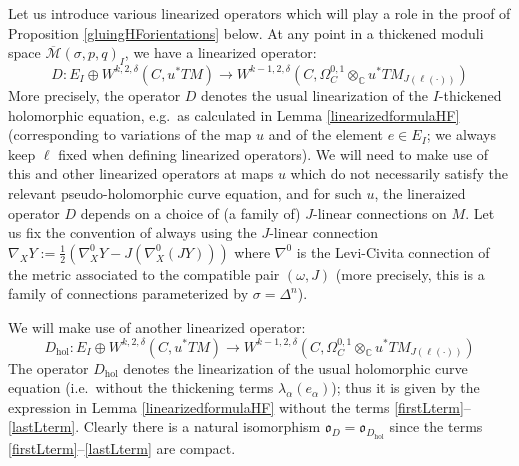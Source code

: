 \documentclass[12pt]{article}
\theoremstyle{definition}
\theoremstyle{remark}
\numberwithin{equation}{subsection}
\newcommand{\oo}{\mathfrak o}
\newcommand{\CC}{\mathbb C}
\newcommand{\Mbar}{\overline{\mathcal M}}
\begin{document}
Let us introduce various linearized operators which will play a role in the proof of Proposition \ref{gluingHForientations} below.  At any point in a thickened moduli space $\Mbar(\sigma,p,q)_I$, we have a linearized operator:
\begin{equation}
\label{linearizedstd}D:E_I\oplus W^{k,2,\delta}(C,u^\ast TM)\to W^{k-1,2,\delta}(C,\Omega^{0,1}_C\otimes_\CC u^\ast TM_{J(\ell(\cdot))})
\end{equation}
More precisely, the operator $D$ denotes the usual linearization of the $I$-thickened holomorphic equation, e.g.\ as calculated in Lemma \ref{linearizedformulaHF} (corresponding to variations of the map $u$ and of the element $e\in E_I$; we always keep $\ell$ fixed when defining linearized operators).  We will need to make use of this and other linearized operators at maps $u$ which do not necessarily satisfy the relevant pseudo-holomorphic curve equation, and for such $u$, the lineraized operator $D$ depends on a choice of (a family of) $J$-linear connections on $M$.  Let us fix the convention of always using the $J$-linear connection $\nabla_XY:=\frac 12(\nabla^0_XY-J(\nabla^0_X(JY)))$ where $\nabla^0$ is the Levi-Civita connection of the metric associated to the compatible pair $(\omega,J)$ (more precisely, this is a family of connections parameterized by $\sigma=\Delta^n$).

We will make use of another linearized operator:
\begin{equation}
\label{linearizedhol}D_\text{hol}:E_I\oplus W^{k,2,\delta}(C,u^\ast TM)\to W^{k-1,2,\delta}(C,\Omega^{0,1}_C\otimes_\CC u^\ast TM_{J(\ell(\cdot))})
\end{equation}
The operator $D_\text{hol}$ denotes the linearization of the usual holomorphic curve equation (i.e.\ without the thickening terms $\lambda_\alpha(e_\alpha)$); thus it is given by the expression in Lemma \ref{linearizedformulaHF} without the terms \eqref{firstLterm}--\eqref{lastLterm}.  Clearly there is a natural isomorphism $\oo_D=\oo_{D_\text{hol}}$ since the terms \eqref{firstLterm}--\eqref{lastLterm} are compact.
\end{document}
